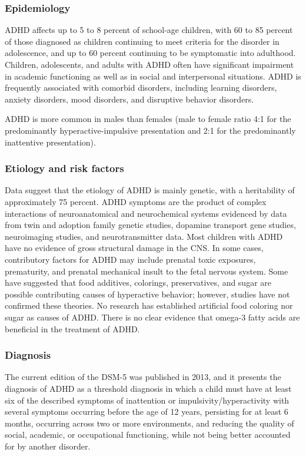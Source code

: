 \subsubsection{Epidemiology}
ADHD affects up to 5 to 8 percent of school-age children, with 60 to 85 percent of those diagnosed as children continuing to meet criteria for the disorder in adolescence, and up to 60 percent continuing to be symptomatic into adulthood. Children, adolescents, and adults with ADHD often have significant impairment in academic functioning as well as in social and interpersonal situations. ADHD is frequently associated with comorbid disorders, including learning disorders, anxiety disorders, mood disorders, and disruptive behavior disorders. \cite{Boland2021-by}

ADHD is more common in males than females (male to female ratio 4:1 for the
predominantly hyperactive-impulsive presentation and 2:1 for the predominantly
inattentive presentation). \cite{ADHDUpToDate}

\subsubsection{Etiology and risk factors}
Data suggest that the etiology of ADHD is mainly genetic, with a heritability of approximately 75 percent. ADHD symptoms are the product of complex interactions of neuroanatomical and neurochemical systems evidenced by data from twin and adoption family genetic studies, dopamine transport gene studies, neuroimaging studies, and neurotransmitter data. Most children with ADHD have no evidence of gross structural damage in the CNS. In some cases, contributory factors for ADHD may include prenatal toxic exposures, prematurity, and prenatal mechanical insult to the fetal nervous system. Some have suggested that food additives, colorings, preservatives, and sugar are possible contributing causes of hyperactive behavior; however, studies have not confirmed these theories. No research has established artificial food coloring nor sugar as causes of ADHD. There is no clear evidence that omega-3 fatty acids are beneficial in the treatment of ADHD. \cite{Boland2021-by, ADHDUpToDate, Nelson50}

\subsubsection{Diagnosis}
The current edition of the DSM-5 was published in 2013, and it presents the diagnosis of ADHD as a threshold diagnosis in which a child must have at least six of the described symptoms of inattention or impulsivity/hyperactivity with
several symptoms occurring before the age of 12 years, persisting for at least 6 months, occurring across two or more
environments, and reducing the quality of social, academic, or occupational functioning, while not being better
accounted for by another disorder. \cite{Lazar2025}

